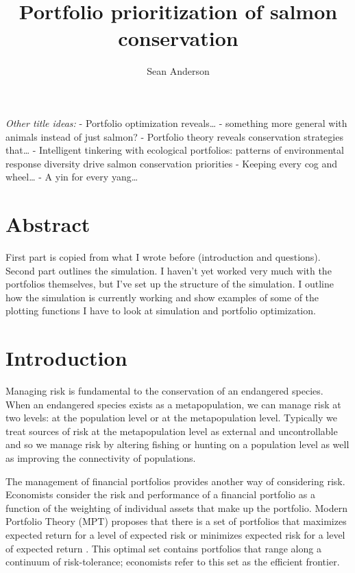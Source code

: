 \documentclass[12pt]{article}
\title{Portfolio prioritization of salmon conservation}
\author{Sean Anderson}
\date{}
\begin{document}
\maketitle

\emph{Other title ideas:} - Portfolio optimization reveals\ldots{} -
something more general with animals instead of just salmon? - Portfolio
theory reveals conservation strategies that\ldots{} - Intelligent
tinkering with ecological portfolios: patterns of environmental response
diversity drive salmon conservation priorities - Keeping every cog and
wheel\ldots{} - A yin for every yang\ldots{}

\section{Abstract}

First part is copied from what I wrote before (introduction and
questions). Second part outlines the simulation. I haven't yet worked
very much with the portfolios themselves, but I've set up the structure
of the simulation. I outline how the simulation is currently working and
show examples of some of the plotting functions I have to look at
simulation and portfolio optimization.

\section{Introduction}

Managing risk is fundamental to the conservation of an endangered
species. When an endangered species exists as a metapopulation, we can
manage risk at two levels: at the population level or at the
metapopulation level. Typically we treat sources of risk at the
metapopulation level as external and uncontrollable and so we manage
risk by altering fishing or hunting on a population level as well as
improving the connectivity of populations.

The management of financial portfolios provides another way of
considering risk. Economists consider the risk and performance of a
financial portfolio as a function of the weighting of individual assets
that make up the portfolio. Modern Portfolio Theory (MPT) proposes that
there is a set of portfolios that maximizes expected return for a level
of expected risk or minimizes expected risk for a level of expected
return \citep{Markowitz1952, Markowitz1959}. This optimal set contains
portfolios that range along a continuum of risk-tolerance; economists
refer to this set as the efficient frontier.
\end{document}
